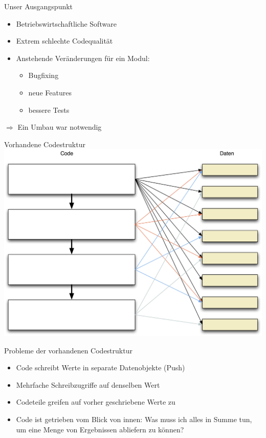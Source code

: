 \begin{frame}[fragile]{Unser Ausgangspunkt}
\begin{itemize}
\item Betriebswirtschaftliche Software
\item Extrem schlechte Codequalität
\item Anstehende Veränderungen für ein Modul:
\begin{itemize}
\item Bugfixing
\item neue Features
\item bessere Tests
\end{itemize}
\end{itemize}

$\Rightarrow$ Ein Umbau war notwendig
\end{frame}

\begin{frame}[fragile]{Vorhandene Codestruktur}
\includegraphics[width=.8 \paperwidth]{Codestruktur.png}
\end{frame}

\begin{frame}[fragile]{Probleme der vorhandenen Codestruktur}
\begin{itemize}
\item Code schreibt Werte in separate Datenobjekte (\glqq Push\grqq{})
\item Mehrfache Schreibzugriffe auf denselben Wert
\item Codeteile greifen auf vorher geschriebene Werte zu
\item Code ist getrieben vom Blick von innen: Was muss ich alles in Summe tun, um eine Menge von Ergebnissen abliefern zu können?
\end{itemize}
\end{frame}



